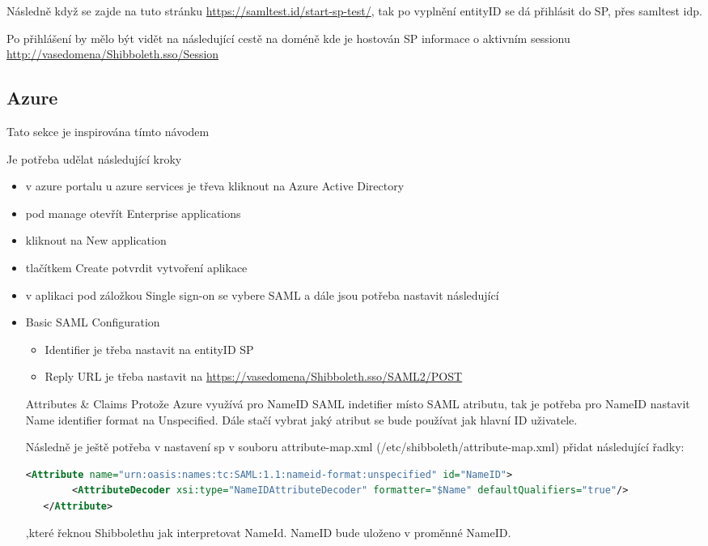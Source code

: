 Následně když se zajde na tuto stránku \url{https://samltest.id/start-sp-test/}, tak po vyplnění entityID se dá přihlásit do SP, přes samltest idp.

Po přihlášení by mělo být vidět na následující cestě na doméně kde je hostován SP informace o aktivním sessionu \url{http://vasedomena/Shibboleth.sso/Session} 



\subsection{Azure}

Tato sekce je inspirována tímto návodem\cite{AzureTutorial}


Je potřeba udělat následující kroky
\begin{itemize}
    \item v azure portalu u azure services je třeva kliknout na Azure Active Directory
    \item pod manage otevřít Enterprise applications
    \item kliknout na New application
    \item tlačítkem Create potvrdit vytvoření aplikace
    \item v aplikaci pod záložkou Single sign-on se vybere SAML a dále jsou potřeba nastavit následující
    \item Basic SAML Configuration
    \begin{itemize}
        \item Identifier je třeba nastavit na entityID SP
        \item Reply URL je třeba nastavit na \url{https://vasedomena/Shibboleth.sso/SAML2/POST}
    \end{itemize}
    \item [Attributes & Claims]
    Protože Azure využívá pro NameID SAML indetifier místo SAML atributu, tak je potřeba pro NameID nastavit Name identifier format na Unspecified.
    Dále stačí vybrat jaký atribut se bude používat jak hlavní ID uživatele.
    
    Následně je ještě potřeba v nastavení sp v souboru attribute-map.xml (/etc/shibboleth/attribute-map.xml) přidat následující řadky:
    
    \begin{lstlisting}[language=XML]
   <Attribute name="urn:oasis:names:tc:SAML:1.1:nameid-format:unspecified" id="NameID">
        <AttributeDecoder xsi:type="NameIDAttributeDecoder" formatter="$Name" defaultQualifiers="true"/>
   </Attribute>
\end{lstlisting}
,které řeknou Shibbolethu jak interpretovat NameId. NameID bude uloženo v proměnné NameID.


\end{itemize}
